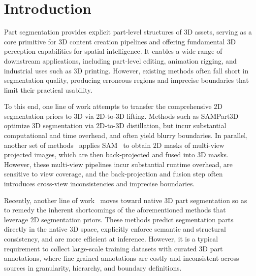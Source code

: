 \section{Introduction}

Part segmentation provides explicit part-level structures of 3D assets, serving as a core primitive for 3D content creation pipelines and offering fundamental 3D perception capabilities for spatial intelligence.
%
It enables a wide range of downstream applications, including part-level editing, animation rigging, and industrial uses such as 3D printing.
%
However, existing methods often fall short in segmentation quality, producing erroneous regions and imprecise boundaries that limit their practical usability.


To this end, one line of work attempts to transfer the comprehensive 2D segmentation priors to 3D via 2D-to-3D lifting.
%
Methods such as SAMPart3D~\cite{sampart3d} optimize 3D segmentation via 2D-to-3D distillation, 
but incur substantial computational and time overhead, and often yield blurry boundaries.
%
In parallel, another set of methods~\cite{segment3d,pointsam,geosam2} applies SAM~\cite{sam,sam2,sam3} to obtain 2D masks of multi-view projected images, which are then back-projected and fused into 3D masks.
%
However, these multi-view pipelines incur substantial runtime overhead, are sensitive to view coverage, and the back-projection and fusion step often introduces cross-view inconsistencies and imprecise boundaries.

Recently, another line of work~\cite{p3sam,partsam} moves toward native 3D part segmentation so as to remedy the inherent shortcomings of the aforementioned methods that leverage 2D segmentation priors.
%
These methods predict segmentation parts directly in the native 3D space, explicitly enforce semantic and structural consistency, and are more efficient at inference.
%
However, it is a typical requirement to collect large-scale training datasets with curated 3D part annotations, 
where fine-grained annotations are costly and inconsistent across sources in granularity, hierarchy, and boundary definitions.


